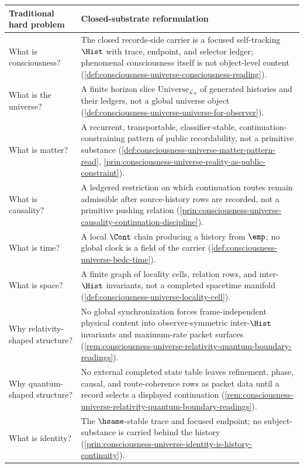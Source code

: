 \begin{longtable}{p{}p{}}
\toprule
\textbf{Traditional hard problem} & \textbf{Closed-substrate reformulation} \\
\midrule
What is consciousness? & The closed records-side carrier is a focused self-tracking $\Hist$ with trace, endpoint, and selector ledger; phenomenal consciousness itself is not object-level content (\autoref{def:consciousness-universe-consciousness-reading}). \\
What is the universe? & A finite horizon slice $\mathrm{Universe}_{\mathcal{L}_N}$ of generated histories and their ledgers, not a global universe object (\autoref{def:consciousness-universe-universe-for-observer}). \\
What is matter? & A recurrent, transportable, classifier-stable, continuation-constraining pattern of public recordability, not a primitive substance (\autoref{def:consciousness-universe-matter-pattern-read}, \autoref{prin:consciousness-universe-reality-as-public-constraint}). \\
What is causality? & A ledgered restriction on which continuation routes remain admissible after source-history rows are recorded, not a primitive pushing relation (\autoref{prin:consciousness-universe-causality-continuation-discipline}). \\
What is time? & A local $\Cont$ chain producing a history from $\emp$; no global clock is a field of the carrier (\autoref{def:consciousness-universe-bedc-time}). \\
What is space? & A finite graph of locality cells, relation rows, and inter-$\Hist$ invariants, not a completed spacetime manifold (\autoref{def:consciousness-universe-locality-cell}). \\
Why relativity-shaped structure? & No global synchronization forces frame-independent physical content into observer-symmetric inter-$\Hist$ invariants and maximum-rate packet surfaces (\autoref{rem:consciousness-universe-relativity-quantum-boundary-readings}). \\
Why quantum-shaped structure? & No external completed state table leaves refinement, phase, causal, and route-coherence rows as packet data until a record selects a displayed continuation (\autoref{rem:consciousness-universe-relativity-quantum-boundary-readings}). \\
What is identity? & The $\hsame$-stable trace and focused endpoint; no subject-substance is carried behind the history (\autoref{prin:consciousness-universe-identity-is-history-continuity}). \\

\end{longtable}
